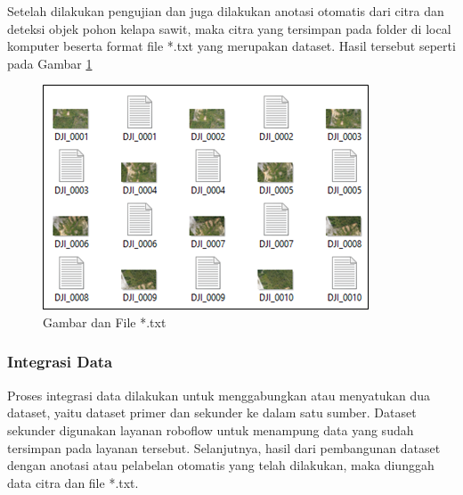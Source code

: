 Setelah dilakukan pengujian dan juga dilakukan anotasi otomatis dari citra dan deteksi objek pohon kelapa sawit, maka citra yang tersimpan pada folder di local komputer beserta format file *.txt yang merupakan dataset. Hasil tersebut seperti pada Gambar \ref{img:Gambar-Dan-File.txt}

\begin{figure}[H]
	\vspace{-0.1cm}
	\begin{center}
		\includegraphics[width=0.8\columnwidth]{bab4/Gambar/Picture19.png}
	\end{center}
	\vspace{-0.2cm}
	\captionsetup{justification=centering}
	\caption{Gambar dan File *.txt}\label{img:Gambar-Dan-File.txt}
\end{figure}

\subsubsection{Integrasi Data}
\hspace{1,2cm}
Proses integrasi data dilakukan untuk menggabungkan atau menyatukan dua dataset, yaitu dataset primer dan sekunder ke dalam satu sumber. Dataset sekunder digunakan layanan roboflow untuk menampung data yang sudah tersimpan pada layanan tersebut. Selanjutnya, hasil dari pembangunan dataset dengan anotasi atau pelabelan otomatis yang telah dilakukan, maka diunggah data citra dan file *.txt. 

